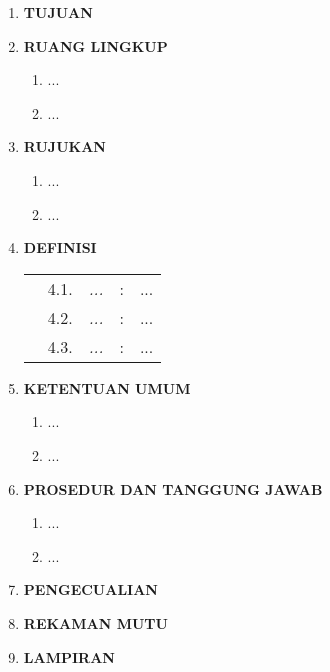 \documentclass[12pt]{npl.doc}
\begin{document}
    \newpage

    \begin{enumerate}
        \item \textbf{TUJUAN}

        \item \textbf{RUANG LINGKUP}
            \begin{enumerate}
                \item ...
                \item ...
            \end{enumerate}

        \item \textbf{RUJUKAN}
            \begin{enumerate}
                \item ...
                \item ...
            \end{enumerate}

        \item \textbf{DEFINISI}
            \begin{longtable}{p{8pt} r p{3cm} c p{10.98cm}}
                & 4.1. & \textit{...} & : & ...\\
                & 4.2. & \textit{...} & : & ...\\
                & 4.3. & \textit{...} & : & ...\\
            \end{longtable}

        \item \textbf{KETENTUAN UMUM}
            \begin{enumerate}
                \item ...
                \item ...
            \end{enumerate}

        \item \textbf{PROSEDUR DAN TANGGUNG JAWAB}
            \begin{enumerate}
                \item ...
                \item ...
            \end{enumerate}

        \item \textbf{PENGECUALIAN}
        \item \textbf{REKAMAN MUTU}
        \item \textbf{LAMPIRAN}
    \end{enumerate}
\end{document}
